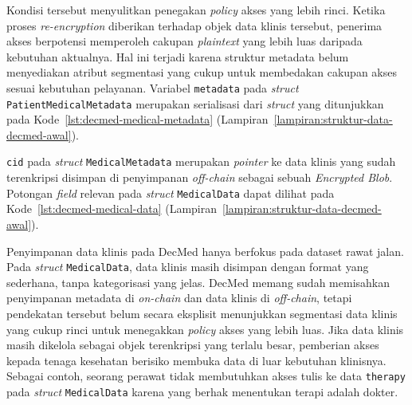 Kondisi tersebut menyulitkan penegakan \textit{policy} akses yang lebih rinci. Ketika proses \textit{re-encryption} diberikan terhadap objek data klinis tersebut, penerima akses berpotensi memperoleh cakupan \textit{plaintext} yang lebih luas daripada kebutuhan aktualnya. Hal ini terjadi karena struktur metadata belum menyediakan atribut segmentasi yang cukup untuk membedakan cakupan akses sesuai kebutuhan pelayanan. Variabel \texttt{metadata} pada \textit{struct} \texttt{PatientMedicalMetadata} merupakan serialisasi dari \textit{struct} yang ditunjukkan pada Kode~\ref{lst:decmed-medical-metadata} (Lampiran~\ref{lampiran:struktur-data-decmed-awal}).

\texttt{cid} pada \textit{struct} \texttt{MedicalMetadata} merupakan \textit{pointer} ke data klinis yang sudah terenkripsi disimpan di penyimpanan \textit{off-chain} sebagai sebuah \textit{Encrypted Blob}. Potongan \textit{field} relevan pada \textit{struct} \texttt{MedicalData} dapat dilihat pada Kode~\ref{lst:decmed-medical-data} (Lampiran~\ref{lampiran:struktur-data-decmed-awal}).

Penyimpanan data klinis pada DecMed hanya berfokus pada dataset rawat jalan. Pada \textit{struct} \texttt{MedicalData}, data klinis masih disimpan dengan format yang sederhana, tanpa kategorisasi yang jelas. DecMed memang sudah memisahkan penyimpanan metadata di \textit{on-chain} dan data klinis di \textit{off-chain}, tetapi pendekatan tersebut belum secara eksplisit menunjukkan segmentasi data klinis yang cukup rinci untuk menegakkan \textit{policy} akses yang lebih luas. Jika data klinis masih dikelola sebagai objek terenkripsi yang terlalu besar, pemberian akses kepada tenaga kesehatan berisiko membuka data di luar kebutuhan klinisnya. Sebagai contoh, seorang perawat tidak membutuhkan akses tulis ke data \texttt{therapy} pada \textit{struct} \texttt{MedicalData} karena yang berhak menentukan terapi adalah dokter.




